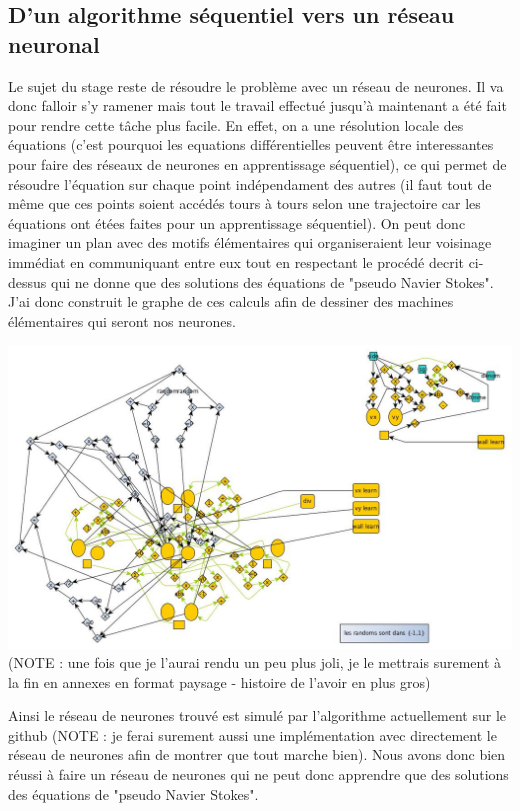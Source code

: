\documentclass[12pt]{article}
\begin{document}
\subsection{D'un algorithme séquentiel vers un réseau neuronal}
Le sujet du stage reste de résoudre le problème avec un réseau de neurones. Il va donc falloir s'y ramener mais tout le travail effectué jusqu'à maintenant a été fait pour rendre cette tâche plus facile. En effet, on a une résolution locale des équations (c'est pourquoi les equations différentielles peuvent être interessantes pour faire des réseaux de neurones en apprentissage séquentiel), ce qui permet de résoudre l'équation sur chaque point indépendament des autres (il faut tout de même que ces points soient accédés tours à tours selon une trajectoire car les équations ont étées faites pour un apprentissage séquentiel). On peut donc imaginer un plan avec des motifs élémentaires qui organiseraient leur voisinage immédiat en communiquant entre eux tout en respectant le procédé decrit ci-dessus qui ne donne que des solutions des équations de "pseudo Navier Stokes". J'ai donc construit le graphe de ces calculs afin de dessiner des machines élémentaires qui seront nos neurones.

\includegraphics[scale=0.35]{ex_rna.jpg}\\
(NOTE : une fois que je l'aurai rendu un peu plus joli, je le mettrais surement à la fin en annexes en format paysage - histoire de l'avoir en plus gros)

Ainsi le réseau de neurones trouvé est simulé par l'algorithme actuellement sur le github (NOTE : je ferai surement aussi une implémentation avec directement le réseau de neurones afin de montrer que tout marche bien).
Nous avons donc bien réussi à faire un réseau de neurones qui ne peut donc apprendre que des solutions des équations de "pseudo Navier Stokes".
\end{document}
